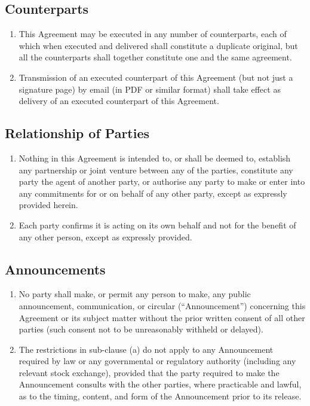 \subsection{Counterparts}
\begin{enumerate}[label=(\alph*)]
\item This Agreement may be executed in any number of counterparts, each of which when executed and delivered shall constitute a duplicate original, but all the counterparts shall together constitute one and the same agreement.
\item Transmission of an executed counterpart of this Agreement (but not just a signature page) by email (in PDF or similar format) shall take effect as delivery of an executed counterpart of this Agreement.
\end{enumerate}

\subsection{Relationship of Parties}
\begin{enumerate}[label=(\alph*)]
\item Nothing in this Agreement is intended to, or shall be deemed to, establish any partnership or joint venture between any of the parties, constitute any party the agent of another party, or authorise any party to make or enter into any commitments for or on behalf of any other party, except as expressly provided herein.
\item Each party confirms it is acting on its own behalf and not for the benefit of any other person, except as expressly provided.
\end{enumerate}

\subsection{Announcements}
\begin{enumerate}[label=(\alph*)]
\item No party shall make, or permit any person to make, any public announcement, communication, or circular (``Announcement'') concerning this Agreement or its subject matter without the prior written consent of all other parties (such consent not to be unreasonably withheld or delayed).
\item The restrictions in sub-clause (a) do not apply to any Announcement required by law or any governmental or regulatory authority (including any relevant stock exchange), provided that the party required to make the Announcement consults with the other parties, where practicable and lawful, as to the timing, content, and form of the Announcement prior to its release.
\end{enumerate}

